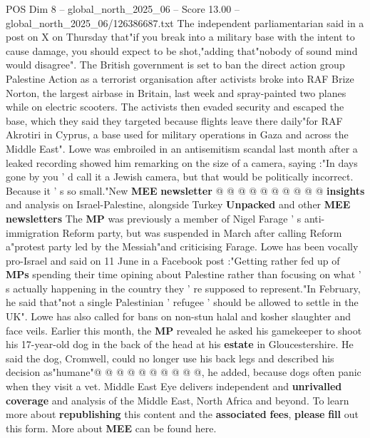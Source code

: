 \begin{textsample}{POS Dim 8 – global\_north\_2025\_06 – Score 13.00 – global\_north\_2025\_06/126386687.txt}  \label{ex:f8_pos_044}
The independent parliamentarian said in a post on X on Thursday that"if you break into a military base with the intent to cause damage, you should expect to be shot,"adding that"nobody of sound mind would disagree".
The British government is set to ban the direct action group Palestine Action as a terrorist organisation after activists broke into RAF Brize Norton, the largest airbase in Britain, last week and spray-painted two planes while on electric scooters.
The activists then evaded security and escaped the base, which they said they targeted because flights leave there daily"for RAF Akrotiri in Cyprus, a base used for military operations in Gaza and across the Middle East".
Lowe was embroiled in an antisemitism scandal last month after a leaked recording showed him remarking on the size of a camera, saying :"In days gone by you ' d call it a Jewish camera, but that would be politically incorrect.
Because it ' s so small."New \textbf{MEE} \textbf{newsletter} @ @ @ @ @ @ @ @ @ @ \textbf{insights} and analysis on Israel-Palestine, alongside Turkey \textbf{Unpacked} and other \textbf{MEE} \textbf{newsletters} The \textbf{MP} was previously a member of Nigel Farage ' s anti-immigration Reform party, but was suspended in March after calling Reform a"protest party led by the Messiah"and criticising Farage.
Lowe has been vocally pro-Israel and said on 11 June in a Facebook post :"Getting rather fed up of \textbf{MPs} spending their time opining about Palestine rather than focusing on what ' s actually happening in the country they ' re supposed to represent."In February, he said that"not a single Palestinian ' refugee ' should be allowed to settle in the UK".
Lowe has also called for bans on non-stun halal and kosher slaughter and face veils.
Earlier this month, the \textbf{MP} revealed he asked his gamekeeper to shoot his 17-year-old dog in the back of the head at his \textbf{estate} in Gloucestershire.
He said the dog, Cromwell, could no longer use his back legs and described his decision as"humane"@ @ @ @ @ @ @ @ @ @, he added, because dogs often panic when they visit a vet.
Middle East Eye delivers independent and \textbf{unrivalled} \textbf{coverage} and analysis of the Middle East, North Africa and beyond.
To learn more about \textbf{republishing} this content and the \textbf{associated} \textbf{fees}, \textbf{please} \textbf{fill} out this form.
More about \textbf{MEE} can be found here.

\end{textsample}
